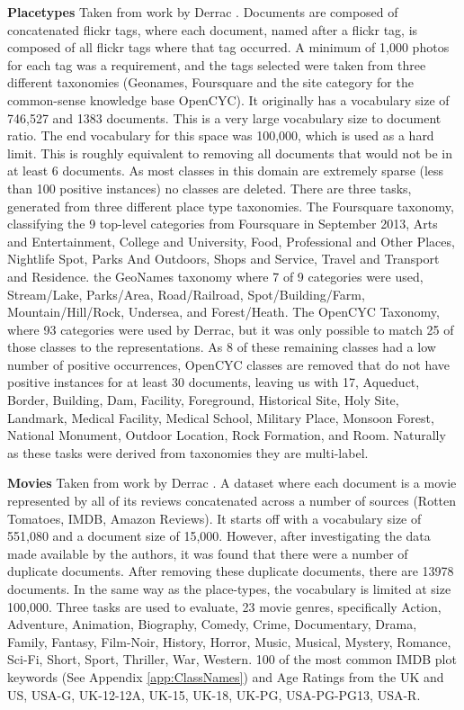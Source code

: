 \textbf{Placetypes} Taken from work by Derrac \cite{Derrac2015}. Documents are composed of concatenated flickr tags, where each document, named after a flickr tag, is composed of all flickr tags where that tag occurred. A minimum of 1,000 photos for each tag was a requirement, and the tags selected were taken from three different taxonomies (Geonames, Foursquare and the site category for the common-sense knowledge base OpenCYC).  It originally has a vocabulary size of 746,527 and 1383 documents. This is a very large vocabulary size to document ratio. The end vocabulary for this space was 100,000, which is used as a hard limit. This is roughly equivalent to removing all documents that would not be in at least 6 documents. As most classes in this domain are extremely sparse (less than 100 positive instances) no classes are deleted. There are three tasks, generated from three different place type taxonomies. The Foursquare taxonomy, classifying the 9 top-level categories from Foursquare in September 2013, Arts and Entertainment, College and University, Food, Professional and Other Places, Nightlife Spot, Parks And Outdoors, Shops and Service, Travel and Transport and Residence. the GeoNames taxonomy where 7 of 9 categories were used, Stream/Lake, Parks/Area, Road/Railroad, Spot/Building/Farm, Mountain/Hill/Rock, Undersea, and Forest/Heath. The OpenCYC Taxonomy, where 93 categories were used by Derrac, but it was only possible to match 25 of those classes to the representations. As 8 of these remaining classes had a low number of positive occurrences, OpenCYC classes are removed that do not have positive instances for at least 30 documents, leaving us with 17, Aqueduct, Border, Building, Dam, Facility, Foreground, Historical Site, Holy Site, Landmark, Medical Facility, Medical School, Military Place, Monsoon Forest, National Monument, Outdoor Location, Rock Formation, and Room. Naturally as these tasks were derived from taxonomies they are multi-label.

\textbf{Movies} Taken from work by Derrac \cite{Derrac2015}. A dataset where each document is a movie represented by all of its reviews concatenated across a number of sources (Rotten Tomatoes, IMDB, Amazon Reviews). It starts off with a vocabulary size of 551,080 and a document size of 15,000. However, after investigating the data made available by the authors, it was found that there were a number of duplicate documents. After removing these duplicate documents, there are 13978 documents. In the same way as the place-types, the vocabulary is limited at size 100,000. Three tasks are used to evaluate, 23 movie genres, specifically Action, Adventure, Animation, Biography, Comedy, Crime, Documentary, Drama, Family, Fantasy, Film-Noir, History, Horror, Music, Musical, Mystery, Romance, Sci-Fi, Short, Sport, Thriller, War, Western. 100 of the most common IMDB plot keywords (See Appendix \ref{app:ClassNames}) and Age Ratings from the UK and US, USA-G, UK-12-12A, UK-15, UK-18, UK-PG, USA-PG-PG13, USA-R.


